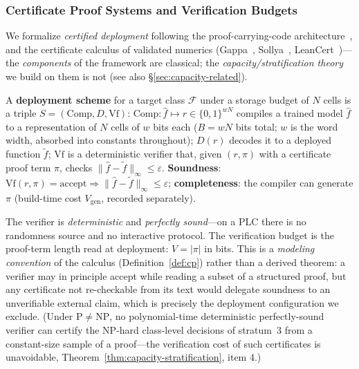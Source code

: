 \subsubsection{Certificate Proof Systems and Verification Budgets}
\label{sec:cp-system}

We formalize \emph{certified deployment} following the proof-carrying-code
architecture~\cite{necula1998pcc,rinard1999credible,pnueli1998translation},
and the certificate calculus of validated numerics (Gappa~\cite{daumas2009gappa},
Sollya~\cite{chevillard2010sollya}, LeanCert~\cite{radisic2025leancert})---the
\emph{components} of the framework are classical; the
\emph{capacity/stratification theory} we build on them is not (see also
\S\ref{sec:capacity-related}).

\begin{definition}
\label{def:deployment-scheme}
A \textbf{deployment scheme} for a target class $\mathcal{F}$ under a
storage budget of $N$ cells is a triple $S = (\text{Comp}, D, \text{Vf})$:
$\text{Comp}\colon \hat f \mapsto r \in \{0,1\}^{wN}$ compiles a trained
model $\hat f$ to a representation of $N$ cells of $w$ bits each
($B = wN$ bits total; $w$ is the word width, absorbed into constants
throughout); $D(r)$ decodes it to a deployed function $\tilde f$;
$\text{Vf}$ is a deterministic verifier that, given $(r, \pi)$ with a
certificate proof term $\pi$, checks
$\|\hat f - \tilde f\|_\infty \leq \varepsilon$. \textbf{Soundness}:
$\text{Vf}(r, \pi) = \text{accept} \Rightarrow \|\hat f - \tilde f\|_\infty
\leq \varepsilon$; \textbf{completeness}: the compiler can generate $\pi$
(build-time cost $V_{\text{gen}}$, recorded separately).
\end{definition}

The verifier is \emph{deterministic} and \emph{perfectly sound}---on a
PLC there is no randomness source and no interactive protocol. The
verification budget is the proof-term length read at deployment:
$V = |\pi|$ in bits. This is a \emph{modeling convention} of the
calculus (Definition~\ref{def:cp}) rather than a derived theorem: a
verifier may in principle accept while reading a subset of a structured
proof, but any certificate not re-checkable from its text would delegate
soundness to an unverifiable external claim, which is precisely the
deployment configuration we exclude. (Under $\mathrm{P} \neq \mathrm{NP}$,
no polynomial-time deterministic perfectly-sound verifier can certify the
NP-hard class-level decisions of stratum~3 from a constant-size sample
of a proof---the verification cost of such certificates is
unavoidable, Theorem~\ref{thm:capacity-stratification}, item 4.)

